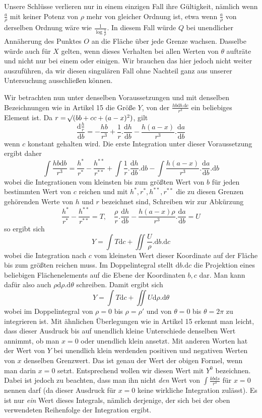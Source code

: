 Unsere Schlüsse verlieren nur in einem einzigen Fall ihre Gültigkeit, nämlich wenn $\frac a\rho$ mit keiner Potenz von $\rho$ mehr von gleicher Ordnung ist, etwa wenn $\frac a\rho$ von derselben Ordnung wäre wie $\frac{1}{\log\frac1\rho}$. In diesem Fall würde $Q$ bei unendlicher Annäherung des Punktes $O$ an die Fläche über jede Grenze wachsen. Dasselbe würde auch für $X$ gelten, wenn dieses Verhalten bei allen Werten von $\theta$ aufträte und nicht nur bei einem oder einigen. Wir brauchen das hier jedoch nicht weiter auszuführen, da wir diesen singulären Fall ohne Nachteil ganz aus unserer Untersuchung ausschließen können.

Wir betrachten nun unter denselben Voraussetzungen und mit denselben Bezeichnungen wie in Artikel 15 die Größe $Y$, von der $\frac{hb\mathrm db.\mathrm dc}{r^3}$ ein beliebiges Element ist. Da $r=\mathord{{}^{}\!\surd}(bb+cc+(a-x)^2)$, gilt
\[
\frac{\mathrm d\frac hr}{\mathrm db}=-\frac{hb}{r^3}+\frac1r.\frac{\mathrm dh}{\mathrm db}-\frac{h(a-x)}{r^3}.\frac{\mathrm da}{\mathrm db}
\]
wenn $c$ konstant gehalten wird. Die erste Integration unter dieser Voraussetzung ergibt daher
\[
\int\frac{hb\mathrm db}{r^3}=\frac{h^*}{r^*}-\frac{h^{**}}{r^{**}}+\int\frac1r.\frac{\mathrm dh}{\mathrm db}.\mathrm db-\int\frac{h(a-x)}{r^3}.\frac{\mathrm da}{\mathrm db}.\mathrm db
\]
wobei die Integrationen vom kleinsten bis zum größten Wert von $b$ für jeden bestimmten Wert von $c$ reichen und mit $h^*,r^*,h^{**},r^{**}$ die zu diesen Grenzen gehörenden Werte von $h$ und $r$ bezeichnet sind, Schreiben wir zur Abkürzung
\[
\frac{h^*}{r^*}-\frac{h^{**}}{r^{**}}=T,\quad\frac\rho r.\frac{\mathrm dh}{\mathrm db}-\frac{h(a-x)\rho}{r^3}.\frac{\mathrm da}{\mathrm db}=U
\]
so ergibt sich
\[
Y=\int T\mathrm dc+\iint\frac U\rho.\mathrm db.\mathrm dc
\]
%
wobei die Integration nach $c$ vom kleinsten Wert dieser Koordinate auf der Fläche bis zum größten reichen muss. Im Doppelintegral stellt $\mathrm db.\mathrm dc$ die Projektion eines beliebigen Flächenelements auf die Ebene der Koordinaten $b,c$ dar. Man kann dafür also auch $\rho\mathrm d\rho.\mathrm d\theta$ schreiben. Damit ergibt sich
\[
Y=\int T\mathrm dc+\iint U\mathrm d\rho.\mathrm d\theta
\]
wobei im Doppelintegral von $\rho=0$ bis $\rho=\rho'$ und von $\theta=0$ bis $\theta=2\pi$ zu integrieren ist. Mit ähnlichen Überlegungen wie in Artikel 15 erkennt man leicht, dass dieser Ausdruck bis auf unendlich kleine Unterschiede denselben Wert annimmt, ob man $x=0$ oder unendlich klein ansetzt. Mit anderen Worten hat der Wert von $Y$ bei unendlich klein werdenden positiven und negativen Werten von $x$ denselben Grenzwert. Das ist genau der Wert der obigen Formel, wenn man darin $x=0$ setzt. Entsprechend wollen wir diesen Wert mit $Y^0$ bezeichnen. Dabei ist jedoch zu beachten, dass man ihn nicht \textit{den} Wert von $\int\frac{kb\mathrm ds}{r^3}$ für $x=0$ nennen darf (da dieser Ausdruck für $x=0$ keine wirkliche Integration zulässt). Es ist nur \textit{ein} Wert dieses Integrals, nämlich derjenige, der sich bei der oben verwendeten Reihenfolge der Integration ergibt.

